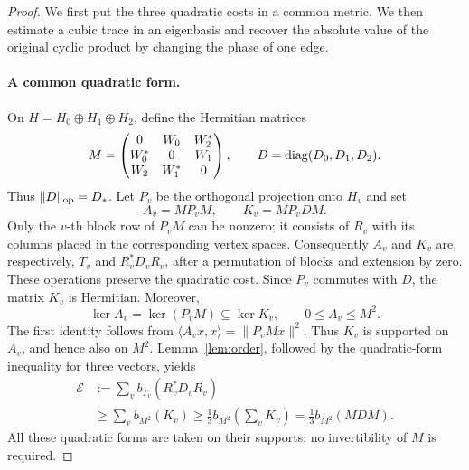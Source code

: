 \begin{proof}
We first put the three quadratic costs in a common metric. We then
estimate a cubic trace in an eigenbasis and recover the absolute value
of the original cyclic product by changing the phase of one edge.

\paragraph{A common quadratic form.}
On $H=H_0\oplus H_1\oplus H_2$, define the Hermitian matrices
\[
 M=\begin{pmatrix}
 0&W_0&W_2^*\\
 W_0^*&0&W_1\\
 W_2&W_1^*&0
 \end{pmatrix},
 \qquad D=\operatorname{diag}(D_0,D_1,D_2).
\]
Thus $\lVert D\rVert_{\mathrm{op}}=D_*$. Let $P_v$ be the orthogonal
projection onto $H_v$ and set
\[
 A_v=MP_vM,\qquad K_v=MP_vDM.
\]
Only the $v$-th block row of $P_vM$ can be nonzero; it consists of
$R_v$ with its columns placed in the corresponding vertex spaces.
Consequently $A_v$ and $K_v$ are,
respectively, $T_v$ and $R_v^*D_vR_v$, after a permutation of blocks
and extension by zero. These operations preserve the quadratic cost.
Since $P_v$ commutes with $D$, the matrix $K_v$ is Hermitian. Moreover,
\[
 \ker A_v=\ker(P_vM)\subseteq\ker K_v,
 \qquad 0\le A_v\le M^2.
\]
The first identity follows from
$\langle A_vx,x\rangle=\lVert P_vMx\rVert^2$.
Thus $K_v$ is supported on $A_v$, and hence also on $M^2$.
Lemma~\ref{lem:order}, followed by the quadratic-form inequality for
three vectors, yields
\begin{equation}\label{eq:trace-common-metric}
 \begin{aligned}
 \mathcal E
 &:=\sum_v b_{T_v}(R_v^*D_vR_v)\\
 &\ge\sum_v b_{M^2}(K_v)
 \ge\frac13 b_{M^2}\left(\sum_vK_v\right)
 =\frac13 b_{M^2}(MDM).
 \end{aligned}
\end{equation}
All these quadratic forms are taken on their supports; no
invertibility of $M$ is required.


\end{proof}
